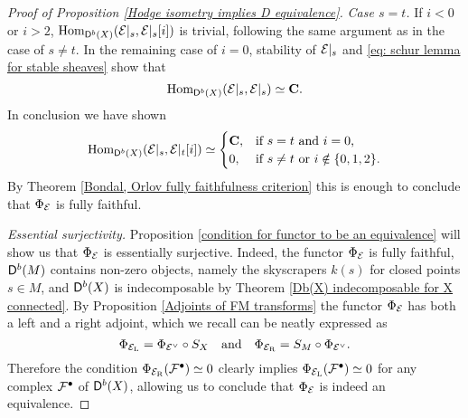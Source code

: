 \begin{proof}[Proof of Proposition \ref{Hodge isometry implies D equivalence}]
    \vspace{0.3cm}
    \noindent
    \textsl{Case $s = t$.}
    If $i < 0$ or $i > 2$, $\mathrm{Hom}_{\mathsf{D}^b(X)}(\mathcal E|_s, \mathcal E|_s[i])$ is trivial, following the same argument as in the case of $s \neq t$. In the remaining case of $i = 0$, stability of $\mathcal E|_s$ and \eqref{eq: schur lemma for stable sheaves} show that 
    \[
        \mathrm{Hom}_{\mathsf{D}^b(X)}(\mathcal E|_s, \mathcal E|_s) \simeq \mathbf C.
    \]
    In conclusion we have shown
    \begin{equation}
            \mathrm{Hom}_{\mathsf{D}^b(X)}(\mathcal E|_s, \mathcal E|_t[i]) \simeq \begin{cases}
                \mathbf C, &\text{if $s = t$ and $i = 0$,} \\
                0, &\text{if $s \neq t$ or $i \notin \{0,1,2\}$.}
            \end{cases}
    \end{equation}
    By Theorem \ref{Bondal, Orlov fully faithfulness criterion} this is enough to conclude that $\Phi_{\mathcal E}$ is fully faithful. 

    

    \vspace{0.3 cm}
    \noindent
    \textsl{Essential surjectivity.} Proposition \ref{condition for functor to be an equivalence} will show us that $\Phi_{\mathcal E}$ is essentially surjective. Indeed, the functor $\Phi_{\mathcal E}$ is fully faithful, $\mathsf{D}^b(M)$ contains non-zero objects, namely the skyscrapers $k(s)$ for closed points $s \in M$, and $\mathsf{D}^b(X)$ is indecomposable by Theorem \ref{Db(X) indecomposable for X connected}. By Proposition \ref{Adjoints of FM transforms} the functor $\Phi_{\mathcal E}$ has both a left and a right adjoint, which we recall can be neatly expressed as
    \[
        \Phi_{\mathcal E_\mathrm{L}} = \Phi_{\mathcal E^\vee} \circ S_X \quad \text{and} \quad \Phi_{\mathcal E_\mathrm{R}} = S_M \circ \Phi_{\mathcal E^\vee}.
    \]
    Therefore the condition $\Phi_{\mathcal E_\mathrm{R}}(\mathcal F^\bullet) \simeq 0$ clearly implies $\Phi_{\mathcal E_\mathrm{L}}(\mathcal F^\bullet) \simeq 0$ for any complex $\mathcal F^\bullet$ of $\mathsf{D}^b(X)$, allowing us to conclude that $\Phi_{\mathcal E}$ is indeed an equivalence.


\end{proof}
